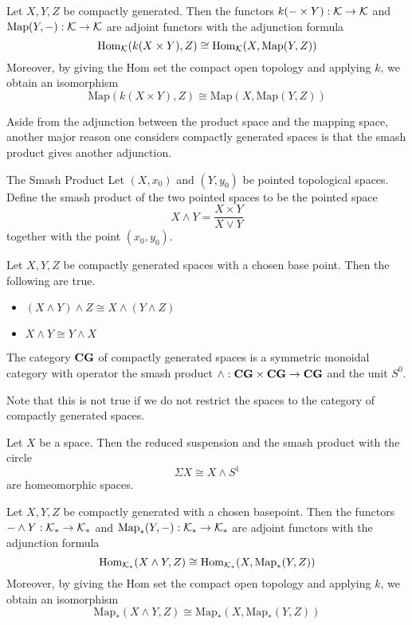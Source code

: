 \documentclass[a4paper]{article}
\begin{document}
\begin{thm}{}{} Let $X,Y,Z$ be compactly generated. Then the functors $k(-\times Y):\mathcal{K}\to\mathcal{K}$ and $\text{Map}(Y,-):\mathcal{K}\to\mathcal{K}$ are adjoint functors with the adjunction formula $$\operatorname{Hom}_{\mathcal{K}}(k(X\times Y),Z)\cong\operatorname{Hom}_{\mathcal{K}}(X,\text{Map}(Y,Z))$$ Moreover, by giving the Hom set the compact open topology and applying $k$, we obtain an isomorphism $$\text{Map}(k(X\times Y),Z)\cong\text{Map}(X,\text{Map}(Y,Z))$$
\end{thm}

Aside from the adjunction between the product space and the mapping space, another major reason one considers compactly generated spaces is that the smash product gives another adjunction. 

\begin{defn}{The Smash Product}{} Let $(X,x_0)$ and $(Y,y_0)$ be pointed topological spaces. Define the smash product of the two pointed spaces to be the pointed space $$X\wedge Y=\frac{X\times Y}{X\vee Y}$$ together with the point $(x_0,y_0)$. 
\end{defn}

\begin{prp}{}{} Let $X,Y,Z$ be compactly generated spaces with a chosen base point. Then the following are true. 
\begin{itemize}
\item $(X\wedge Y)\wedge Z\cong X\wedge(Y\wedge Z)$
\item $X\wedge Y\cong Y\wedge X$
\end{itemize}
\end{prp}

\begin{thm}{}{} The category $\bold{CG}$ of compactly generated spaces is a symmetric monoidal category with operator the smash product $\wedge:\bold{CG}\times\bold{CG}\to\bold{CG}$ and the unit $S^0$. 
\end{thm}

Note that this is not true if we do not restrict the spaces to the category of compactly generated spaces. 

\begin{lmm}{}{} Let $X$ be a space. Then the reduced suspension and the smash product with the circle $$\Sigma X\cong X\wedge S^1$$ are homeomorphic spaces. 
\end{lmm}

\begin{thm}{}{} Let $X,Y,Z$ be compactly generated with a chosen basepoint. Then the functors $-\wedge Y:\mathcal{K}_\ast\to\mathcal{K}_\ast$ and $\text{Map}_\ast(Y,-):\mathcal{K}_\ast\to\mathcal{K}_\ast$ are adjoint functors with the adjunction formula $$\operatorname{Hom}_{\mathcal{K}_\ast}(X\wedge Y,Z)\cong\operatorname{Hom}_{\mathcal{K}_\ast}(X,\text{Map}_\ast(Y,Z))$$ Moreover, by giving the Hom set the compact open topology and applying $k$, we obtain an isomorphism $$\text{Map}_\ast(X\wedge Y,Z)\cong\text{Map}_\ast(X,\text{Map}_\ast(Y,Z))$$
\end{thm}
\end{document}
